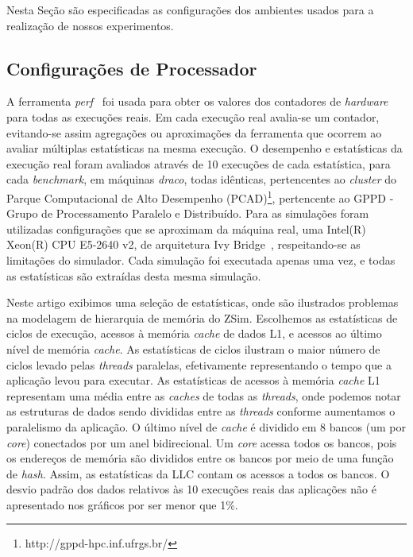 \documentclass[12pt]{article}
\begin{document}
Nesta Seção são especificadas as configurações dos ambientes usados para a realização de nossos experimentos.
\vspace{-2mm}
\subsection{Configurações de Processador}

A ferramenta \emph{perf}~\cite{de2010new} foi usada para obter os valores dos contadores de \textit{hardware} para todas as execuções reais.
Em cada execução real avalia-se um contador, evitando-se assim agregações ou aproximações da ferramenta que ocorrem ao avaliar múltiplas estatísticas na mesma execução.  
O desempenho e estatísticas da execução real foram avaliados através de 10 execuções de cada estatística, para cada \emph{benchmark}, em máquinas \emph{draco}, todas idênticas, pertencentes ao \emph{cluster} do Parque Computacional de Alto Desempenho (PCAD)\footnote{http://gppd-hpc.inf.ufrgs.br/}, pertencente ao GPPD - Grupo de Processamento Paralelo e Distribuído.
Para as simulações foram utilizadas configurações que se aproximam da máquina real, uma Intel(R) Xeon(R) CPU E5-2640 v2, de arquitetura Ivy Bridge~\cite{james2012intel}, respeitando-se as limitações do simulador.
Cada simulação foi executada apenas uma vez, e todas as estatísticas são extraídas desta mesma simulação.

\vspace{-2mm}
Neste artigo exibimos uma seleção de estatísticas, onde são ilustrados problemas na modelagem de hierarquia de memória do ZSim.
Escolhemos as estatísticas de ciclos de execução, acessos à memória \emph{cache} de dados L1, e acessos ao último nível de memória \emph{cache}.
As estatísticas de ciclos ilustram o maior número de ciclos levado pelas \emph{threads} paralelas, efetivamente representando o tempo que a aplicação levou para executar.
As estatísticas de acessos à memória \emph{cache} L1 representam uma média entre as \emph{caches} de todas as \emph{threads}, onde podemos notar as estruturas de dados sendo divididas entre as \emph{threads} conforme aumentamos o paralelismo da aplicação.
O último nível de \textit{cache} é dividido em 8 bancos (um por \textit{core}) conectados por um anel bidirecional.
Um \textit{core} acessa todos os bancos, pois os endereços de memória são divididos entre os bancos por meio de uma função de \textit{hash}.
Assim, as estatísticas da LLC contam os acessos a todos os bancos.
O desvio padrão dos dados relativos às 10 execuções reais das aplicações não é apresentado nos gráficos por ser menor que 1\%. %
\end{document}
